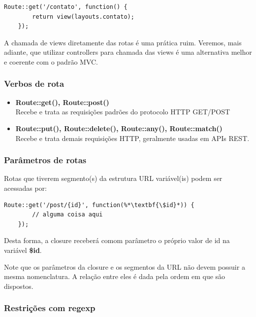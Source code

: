 \documentclass[
12pt,				%
openany,			%
twoside,			%
a4paper,			%
english,			%
french,				%
spanish,			%
brazil,				%
]{abntex2}
\begin{document}
\begin{lstlisting}[style=php,caption={\textit{/routes/web.php 2}}]
    Route::get('/contato', function() {
        return view(layouts.contato);
    });
\end{lstlisting}

A chamada de views diretamente das rotas é uma prática ruim. Veremos, mais adiante, que
utilizar controllers para chamada das views é uma alternativa melhor e coerente com o padrão
MVC.

\subsubsection{Verbos de rota}

\begin{itemize}
    \item \textbf{Route::get(), Route::post()} \\

        Recebe e trata as requisições padrões do protocolo HTTP GET/POST

    \item \textbf{Route::put(), Route::delete(), Route::any(), Route::match()} \\

        Recebe e trata demais requisições HTTP, geralmente usadas em APIs REST.
\end{itemize}

\subsubsection{Parâmetros de rotas}

Rotas que tiverem segmento(s) da estrutura URL variável(is) podem ser acessadas por:

\begin{lstlisting}[style=php,caption={\textit{/routes/web.php 3}}]
    Route::get('/post/{id}', function(%*\textbf{\$id}*)) {
        // alguma coisa aqui
    });
\end{lstlisting}

Desta forma, a closure receberá comom parâmetro o próprio valor de id na variável \textbf{\$id}.

Note que os parâmetros da closure e os segmentos da URL não devem possuir a mesma nomenclatura. A relação entre eles é dada pela ordem em que são dispostos. 

\subsubsection{Restrições com regexp}
\end{document}
